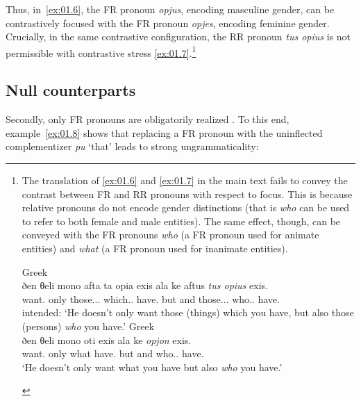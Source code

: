 \documentclass[output=paper]{langsci/langscibook}
\begin{document}
Thus, in~\eqref{ex:01.6}, the \gls{FR} pronoun \emph{opjus}, encoding masculine gender,
can be contrastively focused with the \gls{FR} pronoun \emph{opjes}, encoding
feminine gender. Crucially, in the same contrastive configuration, the
\gls{RR} pronoun \emph{tus opius} is not permissible with contrastive stress
\eqref{ex:01.7}.\footnote{The  translation of \eqref{ex:01.6} and
    \eqref{ex:01.7} in the main text fails to convey the
    contrast between \gls{FR} and \gls{RR} pronouns with respect to focus. This
    is because  relative pronouns do not encode gender
    distinctions (that is \emph{who} can be used to refer to both female and
    male entities). The same effect, though, can be conveyed with the
     \gls{FR} pronouns \emph{who} (a \gls{FR} pronoun used for
    animate entities) and \emph{what} (a \gls{FR} pronoun used for inanimate
    entities).

\begin{exe}
     Greek\\
    \gll \llap{*}ðen θeli mono afta {ta opia} exis ala ke aftus \emph{tus opius} exis.\\
    \Neg{} want.\Tsg{} only those.\glossN.\Pl.\Acc{} which.\glossN.\Pl{} have.\Ssg{} but and those.\M.\Pl.\Acc{} who.\M{}.\Pl{} have.\Ssg{}\\
    \glt intended: \enquote*{He doesn’t only want those (things) which you
            have, but also those (persons) \emph{who} you have.}
     Greek\\
    \gll \llap{*}ðen θeli mono oti exis ala ke \emph{opjon} exis.\\
		\Neg{} want.\Tsg{} only what have.\Ssg{} but and who.\M.\Sg{} have.\Ssg{}\\
	\glt \enquote*{He doesn’t only want what you have but also \emph{who} you have.}
\end{exe}}

\subsection{Null counterparts}
Secondly, only \gls{FR} pronouns are
obligatorily realized \parencite[22]{AleLawMeiWil2000}. To this end,
example~\eqref{ex:01.8} shows that replacing a \gls{FR} pronoun with the
uninflected complementizer \emph{pu} ‘that’ leads to strong ungrammaticality:
\end{document}
